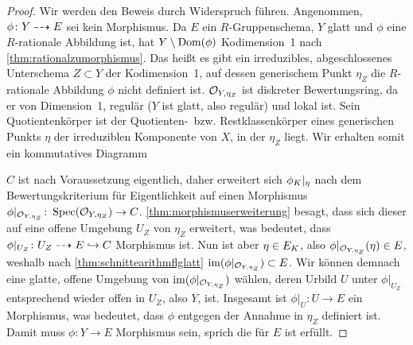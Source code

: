 \begin{Satz}
\begin{proof}
    Wir werden den Beweis durch Widerspruch führen.
    Angenommen, $\phi\colon Y\dashrightarrow E$ sei kein Morphismus.
    Da $E$ ein $R$-Gruppenschema, $Y$ glatt und $\phi$ eine
    $R$-rationale Abbildung ist, hat $Y\setminus\operatorname{Dom}(\phi)$
    Kodimension~1 nach \ref{thm:rationalzumorphismus}.
    Das heißt es gibt ein irreduzibles, abgeschlossenes Unterschema
    $Z\subset Y$ der Kodimension~1, auf dessen generischem Punkt
    $\eta_Z$ die $R$-rationale Abbildung $\phi$ nicht definiert ist.
    $\mathcal{O}_{Y,\eta_Z}$ ist diskreter Bewertungsring, da er von
    Dimension~1, regulär ($Y$ ist glatt, also
    regulär) und lokal ist.
    Sein Quotientenkörper ist der Quotienten-~bzw. Restklassenkörper
    eines generischen Punkts $\eta$ der irreduziblen Komponente von
    $X$, in der $\eta_Z$ liegt. Wir erhalten somit ein kommutatives
    Diagramm
    \begin{center}
    \end{center}
    $C$ ist nach Voraussetzung eigentlich, daher erweitert sich
    $\phi_{K}|_{\eta}$ nach dem Bewertungskriterium für
    Eigentlichkeit auf einen Morphismus
    $\phi|_{\mathcal{O}_{Y,\eta_Z}}\colon\operatorname{Spec}(\mathcal{O}_{Y,\eta_Z})\to C$.
    \ref{thm:morphismuserweiterung} besagt, dass sich
    dieser auf eine offene Umgebung $U_Z$ von $\eta_Z$ erweitert,
    was bedeutet, dass $\phi|_{U_Z}\colon U_Z\dashrightarrow E\hookrightarrow C$
    Morphismus ist.
    Nun ist aber $\eta\in E_{K}$, also
    $\phi|_{\mathcal{O}_{Y,\eta_Z}}(\eta)\in E$, weshalb nach
    \ref{thm:schnittearithmflglatt}
    $\operatorname{im}(\phi|_{\mathcal{O}_{Y,\eta_Z}})\subset E$.
    Wir können demnach eine glatte, offene Umgebung von
    $\operatorname{im}(\phi|_{\mathcal{O}_{Y,\eta_Z}})$ wählen, deren Urbild $U$ unter
    $\phi|_{U_Z}$ entsprechend wieder offen in $U_Z$, also $Y$, ist.
    Insgesamt ist $\phi|_U\colon U\to E$ ein Morphismus, was
    bedeutet, dass $\phi$ entgegen der Annahme in $\eta_Z$ definiert
    ist.
    Damit muss $\phi\colon Y\to E$ Morphismus sein, sprich die
    \NAbbEig für $E$ ist erfüllt.
    

\end{proof}
\end{Satz}
